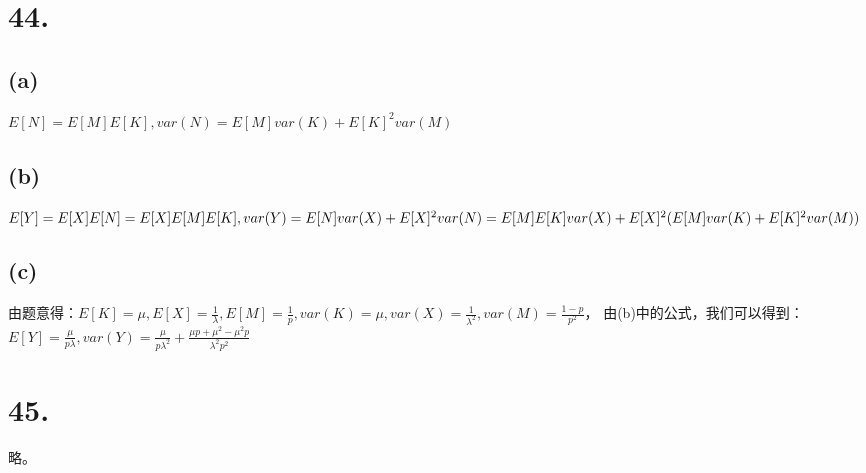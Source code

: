 \documentclass[UTF8]{report}
\begin{document}
    \section*{44.}
        \subsection*{(a)}
            $E[N] = E[M]E[K], var(N) = E[M]var(K) + E[K]^2var(M)$
        \subsection*{(b)}
            $E[Y] = E[X]E[N] = E[X]E[M]E[K], var(Y) = E[N]var(X) +\\ E[X]^2var(N) = E[M]E[K]var(X) + E[X]^2(E[M]var(K) + E[K]^2var(M))$
        \subsection*{(c)}
            由题意得：$E[K] = \mu, E[X] = \frac{1}{\lambda}, E[M] = \frac{1}{p}, var(K) = \mu, var(X) = \frac{1}{\lambda^2}, var(M) = \frac{1 - p}{p^2}$，
            由(b)中的公式，我们可以得到：$E[Y] = \frac{\mu}{p\lambda}, var(Y) = \frac{\mu}{p\lambda^2} + \frac{\mu p + \mu^2 - \mu^2p}{\lambda^2p^2}$
    \section*{45.}
        略。 
\end{document}
